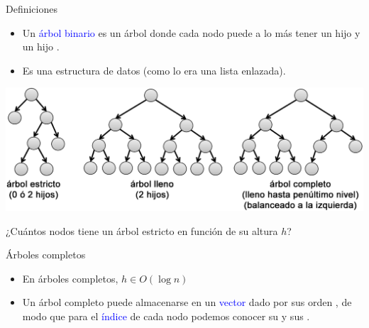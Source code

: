 \documentclass[handout]{beamer} %
\newcommand{\blue}[1]{\textcolor{blue}{#1}}
\newcommand{\redb}[1]{{\color{red!70!black}{#1}}}
\begin{document}
\begin{frame}{Definiciones}

    {\small
    \begin{itemize}
        \item Un \blue{árbol binario} es un árbol donde cada nodo puede a lo más tener un hijo \redb{izquierdo} y un hijo \redb{derecho}.
        \item Es una estructura de datos (como lo era una lista enlazada).
    \end{itemize}}
    \begin{center}
        \includegraphics[width=\textwidth]{./image/cap3/arboles-binarios}
    \end{center}
    \pause
    {\small ¿Cuántos nodos tiene un árbol estricto en función de su altura $h$?}
\end{frame}

\begin{frame}{Árboles completos}
    \begin{itemize}
        \item<1-> En árboles completos, $h\in O(\log n)$
        \item<2-> Un árbol completo puede almacenarse en un \blue{vector} dado por sus orden \redb{recorrido por niveles}, de modo que para el \blue{índice} de cada nodo podemos conocer su \redb{padre} y sus \redb{hijos}.
    \end{itemize}
\end{frame}
\end{document}
